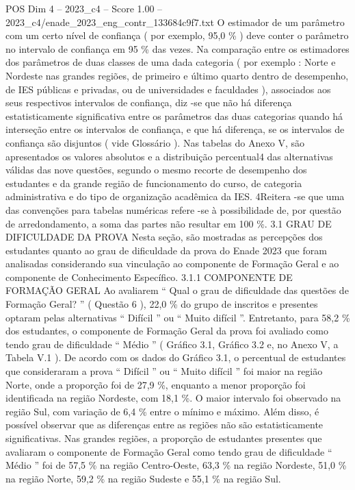 \begin{textsample}{POS Dim 4 – 2023\_c4 – Score 1.00 – 2023\_c4/enade\_2023\_eng\_contr\_133684c9f7.txt}
O estimador de um parâmetro com um certo nível de confiança ( por exemplo, 95,0 \% ) deve conter o parâmetro no intervalo de confiança em 95 \% das vezes.
Na comparação entre os estimadores dos parâmetros de duas classes de uma dada categoria ( por exemplo : Norte e Nordeste nas grandes regiões, de primeiro e último quarto dentro de desempenho, de IES públicas e privadas, ou de universidades e faculdades ), associados aos seus respectivos intervalos de confiança, diz -se que não há diferença estatisticamente significativa entre os parâmetros das duas categorias quando há interseção entre os intervalos de confiança, e que há diferença, se os intervalos de confiança são disjuntos ( vide Glossário ).
Nas tabelas do Anexo V, são apresentados os valores absolutos e a distribuição percentual4 das alternativas válidas das nove questões, segundo o mesmo recorte de desempenho dos estudantes e da grande região de funcionamento do curso, de categoria administrativa e do tipo de organização acadêmica da IES. 4Reitera -se que uma das convenções para tabelas numéricas refere -se à possibilidade de, por questão de arredondamento, a soma das partes não resultar em 100 \%. 3.1 GRAU DE DIFICULDADE DA PROVA Nesta seção, são mostradas as percepções dos estudantes quanto ao grau de dificuldade da prova do Enade 2023 que foram analisadas considerando sua vinculação ao componente de Formação Geral e ao componente de Conhecimento Específico. 3.1.1 COMPONENTE DE FORMAÇÃO GERAL Ao avaliarem “ Qual o grau de dificuldade das questões de Formação Geral? ” ( Questão 6 ), 22,0 \% do grupo de inscritos e presentes optaram pelas alternativas “ Difícil ” ou “ Muito difícil ”.
Entretanto, para 58,2 \% dos estudantes, o componente de Formação Geral da prova foi avaliado como tendo grau de dificuldade “ Médio ” ( Gráfico 3.1, Gráfico 3.2 e, no Anexo V, a Tabela V.1 ).
De acordo com os dados do Gráfico 3.1, o percentual de estudantes que consideraram a prova “ Difícil ” ou “ Muito difícil ” foi maior na região Norte, onde a proporção foi de 27,9 \%, enquanto a menor proporção foi identificada na região Nordeste, com 18,1 \%.
O maior intervalo foi observado na região Sul, com variação de 6,4 \% entre o mínimo e máximo.
Além disso, é possível observar que as diferenças entre as regiões não são estatisticamente significativas.
Nas grandes regiões, a proporção de estudantes presentes que avaliaram o componente de Formação Geral como tendo grau de dificuldade “ Médio ” foi de 57,5 \% na região Centro-Oeste, 63,3 \% na região Nordeste, 51,0 \% na região Norte, 59,2 \% na região Sudeste e 55,1 \% na região Sul.

\end{textsample}
